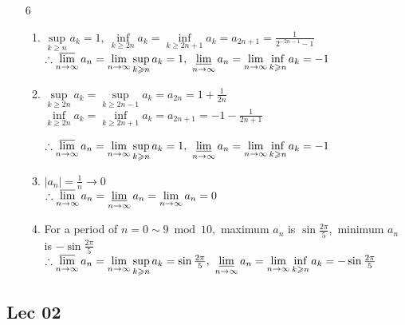 \begin{enumerate}[1]
	\item[6]

\begin{enumerate}[(1)]
	\item 
	\(\sup \limits_{k \geqslant n} a_{k}=1,\  \inf \limits_{k \geqslant 2 n} a_{k}=\inf \limits_{k \geqslant 2 n+1} a_{k}=a_{2 n+1}=\frac{1}{2^{-2 n-1}-1}\)\\
	\(\therefore \varlimsup \limits_{n \rightarrow \infty}  a_{n}=\lim \limits_{n \rightarrow \infty} \sup \limits_{k \geqslant n} a_{k}=1, \ \varliminf \limits_{n \rightarrow \infty} a_{n}=\lim \limits_{n \rightarrow \infty} \inf \limits_{k \geqslant n} a_{k}=-1\)

	\item 
	\(\sup \limits_{k \geqslant 2 n} a_{k}=\sup \limits_{k \geqslant 2 n-1} a_{k}=a_{2 n}=1+\frac{1}{2 n}\)\\
	\(\inf \limits_{k \geqslant 2 n} a_{k}=\inf \limits_{k \geqslant 2 n+1} a_{k}=a_{2 n+1}=-1-\frac{1}{2 n+1}\)

	\(\therefore \varlimsup \limits_{n \rightarrow \infty}  a_{n} = \lim \limits_{n \rightarrow \infty} \sup \limits_{k \geqslant n} a_{k}=1,\  \varliminf \limits_{n \rightarrow \infty} a_{n}=\lim \limits_{n \rightarrow \infty} \inf \limits_{k \geqslant n} a_{k}=-1\)

	\item 
	\(\left|a_{n}\right|=\frac{1}{n} \rightarrow 0\)\\
	\(\therefore \varlimsup \limits_{n \rightarrow \infty} a_{n}=\varliminf \limits_{n \rightarrow \infty} a_{n}=\lim \limits_{n \rightarrow \infty} a_{n}=0\)

	\item 
	For a period of \(n=0 \sim 9 \bmod 10,\) maximum \(a_{n}\) is \(\sin \frac{2 \pi}{5},\) minimum \(a_{n}\) is
	\(-\sin \frac{2 \pi}{5}\)\\
	\(\therefore \varlimsup \limits_{n \rightarrow \infty} a_{n}=\lim \limits_{n \rightarrow \infty} \sup \limits_{k \geqslant n} a_{k}=\sin \frac{2 \pi}{5},\ \varliminf \limits_{n \rightarrow \infty} a_{n}=\lim \limits_{n \rightarrow \infty} \inf \limits_{k \geqslant n} a_{k}=-\sin \frac{2 \pi}{5}\)

\end{enumerate}

\end{enumerate}

\subsection{Lec 02}

